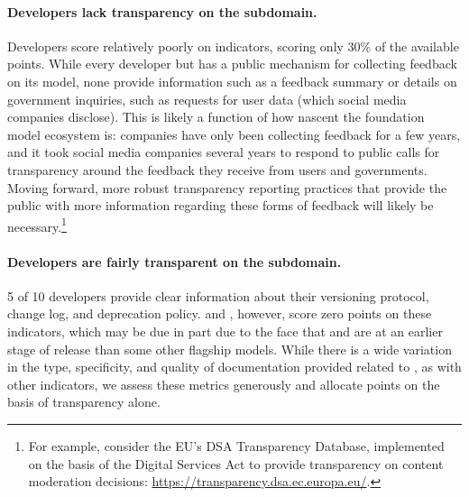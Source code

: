 \paragraph{Developers lack transparency on the \feedback subdomain.} 
Developers score relatively poorly on \feedback indicators, scoring only 30\% of the available points. 
While every developer but \amazon has a public mechanism for collecting feedback on its model, none provide information such as a feedback summary or details on government inquiries, such as requests for user data (which social media companies disclose).
This is likely a function of how nascent the foundation model ecosystem is: companies have only been collecting feedback for a few years, and it took social media companies several years to respond to public calls for transparency around the feedback they receive from users and governments.
Moving forward, more robust transparency reporting practices that provide the public with more information regarding these forms of feedback will likely be necessary.\footnote{For example, consider the EU's DSA Transparency Database, implemented on the basis of the Digital Services Act to provide transparency on content moderation decisions: \url{https://transparency.dsa.ec.europa.eu/}.}

\paragraph{Developers are fairly transparent on the \updates subdomain.}
5 of 10 developers provide clear information about their versioning protocol, change log, and deprecation policy.
\inflection and \amazon, however, score zero points on these indicators, which may be due in part due to the face that \inflectionone and \titan are at an earlier stage of release than some other flagship models. 
While there is a wide variation in the type, specificity, and quality of documentation provided related to \updates, as with other indicators, we assess these metrics generously and allocate points on the basis of transparency alone. 

